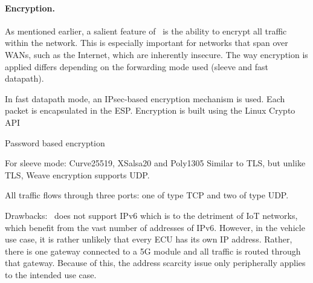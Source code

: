 \paragraph{Encryption.} 
As mentioned earlier, a salient feature of \wnet\ is the ability to encrypt all traffic within the network. This is especially important for networks that span over WANs, such as the Internet, which are inherently insecure. The way encryption is applied differs depending on the forwarding mode used (sleeve and fast datapath).

In fast datapath mode, an IPsec-based encryption mechanism is used. Each packet is encapsulated in the ESP. Encryption is built using the Linux Crypto API

Password based encryption


For sleeve mode:
Curve25519, XSalsa20 and Poly1305
Similar to TLS, but unlike TLS, Weave encryption supports UDP.


All traffic flows through three ports: one of type TCP and two of type UDP.


Drawbacks: \wnet\ does not support IPv6 which is to the detriment of IoT networks, which benefit from the vast number of addresses of IPv6. However, in the vehicle use case, it is rather unlikely that every ECU has its own IP address. Rather, there is one gateway connected to a 5G module and all traffic is routed through that gateway. Because of this, the address scarcity issue only peripherally applies to the intended use case.
